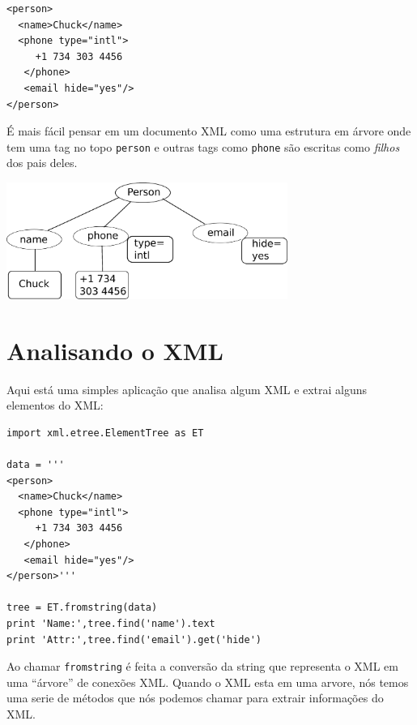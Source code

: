 \beforeverb
\begin{verbatim}
<person>
  <name>Chuck</name>
  <phone type="intl">
     +1 734 303 4456
   </phone>
   <email hide="yes"/>
</person>
\end{verbatim}
\afterverb
%
É mais fácil pensar em um documento XML como uma estrutura em árvore
onde tem uma tag no topo {\tt person} e outras tags como {\tt phone}
são escritas como \emph{filhos} dos pais deles.

\beforefig
\centerline{\includegraphics[height=1.50in]{figs2/xml-tree.eps}}
\afterfig

\section{Analisando o XML}


Aqui está uma simples aplicação que analisa algum XML
e extrai alguns elementos do XML:

\beforeverb
\begin{verbatim}
import xml.etree.ElementTree as ET

data = '''
<person>
  <name>Chuck</name>
  <phone type="intl">
     +1 734 303 4456
   </phone>
   <email hide="yes"/>
</person>'''

tree = ET.fromstring(data)
print 'Name:',tree.find('name').text
print 'Attr:',tree.find('email').get('hide')
\end{verbatim}
\afterverb
%
Ao chamar {\tt fromstring} é feita a conversão da string que 
representa o XML em uma ``árvore'' de conexões XML. Quando o
XML esta em uma arvore, nós temos uma serie de métodos que nós
podemos chamar para extrair informações do XML.

